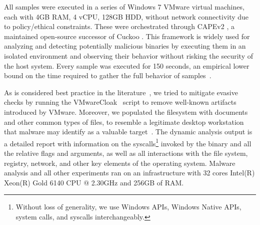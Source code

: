 All samples were executed in a series of Windows 7 VMware virtual machines, each with 4GB RAM, 4 vCPU, 128GB HDD, without network connectivity due to policy/ethical constraints.
These were orchestrated through CAPEv2 \cite{CAPEv2}, a maintained open-source successor of Cuckoo \cite{CUCKOO}. 
This framework is widely used for analyzing and detecting potentially malicious binaries by executing them in an isolated environment and observing their behavior without risking the security of the host system.
Every sample was executed for 150 seconds, an empirical lower bound on the time required to gather the full behavior of samples~\cite{kuchler2021does}.

As is considered best practice in the literature~\cite{maffia2021longitudinal}, we tried to mitigate evasive checks by running the VMwareCloak~\cite{VMwareCloak} script to remove well-known artifacts introduced by VMware.
Moreover, we populated the filesystem with documents and other common types of files, to resemble a legitimate desktop workstation that malware may identify as a valuable target~\cite{miramirkhani2017spotless}. 
The dynamic analysis output is a detailed report with information on the syscalls\footnote{Without loss of generality, we use Windows APIs, Windows Native APIs, system calls, and syscalls interchangeably.} invoked by the binary and all the relative flags and arguments, as well as all interactions with the file system, registry, network, and other key elements of the operating system.
Malware analysis and all other experiments ran on an infrastructure with 32 cores Intel(R) Xeon(R) Gold 6140 CPU @ 2.30GHz and 256GB of RAM.

